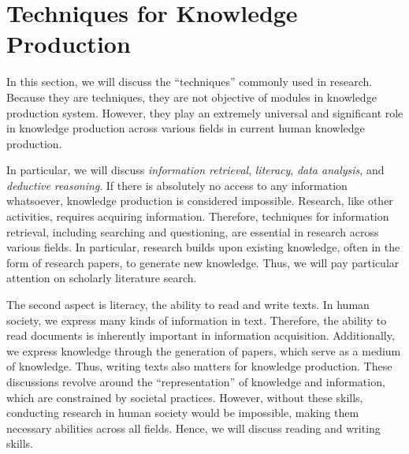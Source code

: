 \documentclass{book}
\begin{document}



\section{Techniques for Knowledge Production}

In this section, we will discuss the ``techniques'' commonly used in research. Because they are techniques, they are not objective of modules in knowledge production system. However, they play an extremely universal and significant role in knowledge production across various fields in current human knowledge production. 

In particular, we will discuss \textit{information retrieval}, \textit{literacy}, \textit{data analysis}, and \textit{deductive reasoning}. If there is absolutely no access to any information whatsoever, knowledge production is considered impossible. Research, like other activities, requires acquiring information. Therefore, techniques for information retrieval, including searching and questioning, are essential in research across various fields. In particular, research builds upon existing knowledge, often in the form of research papers, to generate new knowledge. Thus, we will pay particular attention on scholarly literature search. 

The second aspect is literacy, the ability to read and write texts. In human society, we express many kinds of information in text. Therefore, the ability to read documents is inherently important in information acquisition. Additionally, we express knowledge through the generation of papers, which serve as a medium of knowledge. Thus, writing texts also matters for knowledge production. These discussions revolve around the ``representation'' of knowledge and information, which are constrained by societal practices. However, without these skills, conducting research in human society would be impossible, making them necessary abilities across all fields. Hence, we will discuss reading and writing skills. 
\end{document}
